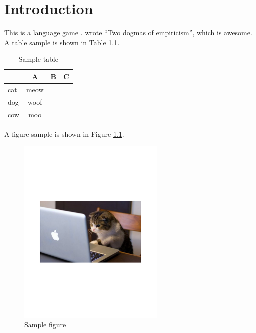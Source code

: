 \chapter{Introduction}
\label{chap:intro}

This is a language game \cite{wittgenstein1953philosophical}.
 wrote ``Two dogmas of empiricism'', which is awesome. 
A table sample is shown in Table \ref{tab:sample}.
\blindtext[3]

\begin{table}[t]
  \small
  \centering
  \begin{tabular}{l|c|c|c} \hline
       & A     & B & C \\ \hline\hline
  cat  & meow  &   &   \\
  dog  & woof  &   &   \\
  cow  & moo   &   &   \\ \hline
  \end{tabular}
  \caption{Sample table}
  \label{tab:sample}
\end{table}

\blindtext[2]
A figure sample is shown in Figure \ref{fig:sample}.

\begin{figure}[t]
  \centering
  \includegraphics[width=70mm]{fig/sample_figure.pdf}
  \caption{Sample figure}
  \label{fig:sample}
\end{figure}


\blindtext[3]

